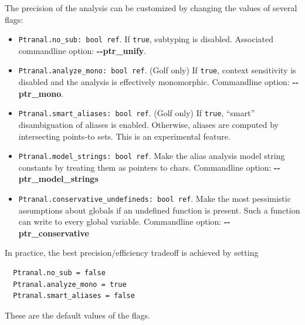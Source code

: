 \documentclass[letterpaper]{article}
\def\t#1{{\tt #1}}
\begin{document}
The precision of the analysis can be customized by changing the values
of several flags:

\begin{itemize}
\item \t{Ptranal.no\_sub: bool ref}.
  If \t{true}, subtyping is disabled.  Associated commandline option:
  {\bf -{}-ptr\_unify}.
\item \t{Ptranal.analyze\_mono: bool ref}.
  (Golf only) If \t{true}, context sensitivity is disabled and the
  analysis is effectively monomorphic.  Commandline option:
  {\bf -{}-ptr\_mono}.
\item \t{Ptranal.smart\_aliases: bool ref}.
  (Golf only) If \t{true}, ``smart'' disambiguation of aliases is
  enabled.  Otherwise, aliases are computed by intersecting points-to
  sets.  This is an experimental feature.
\item \t{Ptranal.model\_strings: bool ref}.
  Make the alias analysis model string constants by treating them as
  pointers to chars.  Commandline option: {\bf -{}-ptr\_model\_strings}
\item \t{Ptranal.conservative\_undefineds: bool ref}.
  Make the most pessimistic assumptions about globals if an undefined
  function is present.  Such a function can write to every global
  variable.  Commandline option: {\bf -{}-ptr\_conservative}
\end{itemize}

In practice, the best precision/efficiency tradeoff is achieved by
setting
\begin{verbatim}
  Ptranal.no_sub = false
  Ptranal.analyze_mono = true
  Ptranal.smart_aliases = false
\end{verbatim}
These are the
default values of the flags.
\end{document}
